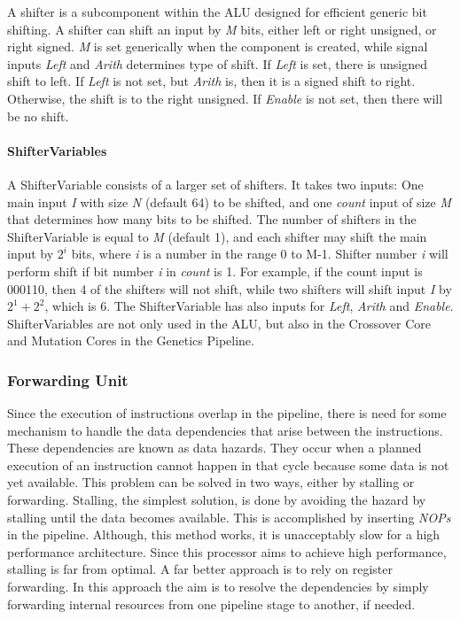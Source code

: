 A shifter is a subcomponent within the ALU designed for efficient generic bit shifting.
A shifter can shift an input by \emph{M} bits, either left or right unsigned, or right signed. \emph{M} is set generically when the component is created, while signal inputs  \emph{Left} and \emph{Arith} determines type of shift. 
If \emph{Left} is set, there is unsigned shift to left.
If \emph{Left} is not set, but \emph{Arith} is, then it is a signed shift to right.
Otherwise, the shift is to the right unsigned.
If \emph{Enable} is not set, then there will be no shift.

\paragraph{ShifterVariables}
A ShifterVariable consists of a larger set of shifters. 
It takes two inputs: One main input \emph{I} with size \emph{N} (default 64) to be shifted, and one \emph{count} input of size \emph{M} that determines how many bits to be shifted. 
The number of shifters in the ShifterVariable is equal to \emph{M} (default 1), and each shifter may shift the main input by $2^i$ bits, where \emph{i} is a number in the range 0 to M-1. 
Shifter number \emph{i} will perform shift if bit number \emph{i} in \emph{count} is 1. 
For example, if the count input is 000110, then 4 of the shifters will not shift, while two shifters will shift input \emph{I} by $2^1 + 2^2$, which is 6.
The ShifterVariable has also inputs for \emph{Left}, \emph{Arith} and \emph{Enable}.
ShifterVariables are not only used in the ALU, but also in the Crossover Core and Mutation Cores in the Genetics Pipeline.



\newpage
\subsubsection{Forwarding Unit} \label{fpga:fitness:sss:forwarding_unit}
Since the execution of instructions overlap in the pipeline, there is need for some mechanism to handle the data dependencies that arise between the instructions.
These dependencies are known as data hazards.
They occur when a planned execution of an instruction cannot happen in that cycle because some data is not yet available.
This problem can be solved in two ways, either by stalling or forwarding.
Stalling, the simplest solution, is done by avoiding the hazard by stalling until the data becomes available.
This is accomplished by inserting \emph{NOPs} in the pipeline.
Although, this method works, it is unacceptably slow for a high performance architecture.
Since this processor aims to achieve high performance, stalling is far from optimal.
A far better approach is to rely on register forwarding.
In this approach the aim is to resolve the dependencies by simply forwarding internal resources from one pipeline stage to another, if needed.

